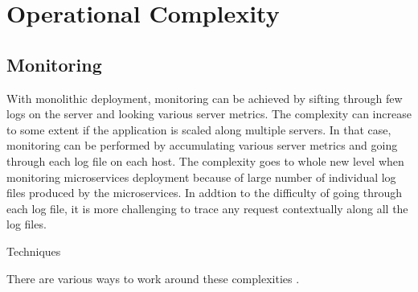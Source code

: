 \section{Operational Complexity}\label{section:challanges_of_microservices_architecture/operational_complexity}
\subsection{Monitoring}\label{section:challanges_of_microservices_architecture/monitoring}
With monolithic deployment, monitoring can be achieved by sifting through few logs on the server and looking various server metrics. The complexity can increase to some extent if the application is scaled along multiple servers. In that case, monitoring can be performed by accumulating various server metrics and going through each log file on each host.
The complexity goes to whole new level when monitoring microservices deployment because of large number of individual log files produced by the microservices. In addtion to the difficulty of going through each log file, it is more challenging to trace any request contextually along all the log files.
\\
\begin{shaded}Techniques\end{shaded}
There are various ways to work around these complexities \cite{Newman:2015aa} \cite{Simone:2014aa}.
